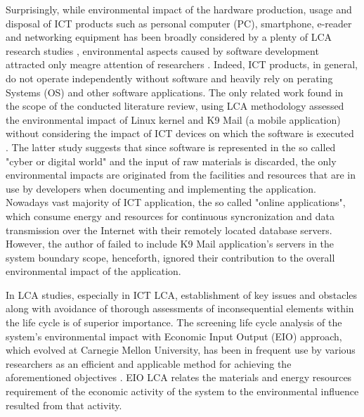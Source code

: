 \documentclass[conference]{IEEEtran}
\begin{document}
Surprisingly, while environmental impact of the hardware production, usage and disposal of ICT products such as personal computer (PC), smartphone, e-reader and networking equipment has been broadly considered by a plenty of LCA research studies \cite{guldbrandsson2012opportunities, Bull201410, farrant2012environmental, enroth2009,koljonen2008environmental}, environmental aspects caused by software development attracted only meagre attention of researchers \cite{Moshnyaga:2013}. Indeed, ICT products, in general, do not operate independently without software and heavily rely on perating Systems (OS) and other software applications. The only related work found in the scope of the conducted literature review, using LCA methodology assessed the environmental impact of Linux kernel and K9 Mail (a mobile application) without considering the impact of ICT devices on which the software is executed \cite{moshnyaga2013assessment,Moshnyaga:2013}. The latter study suggests that since software is represented in the so called "cyber or digital world" and the input of raw materials is discarded, the only environmental impacts are originated from the facilities and resources that are in use by developers when documenting and implementing the application. Nowadays vast majority of ICT application, the so called "online applications", which consume energy and resources for continuous syncronization and data transmission over the Internet with their remotely located database servers. However, the author of \cite{Moshnyaga:2013} failed to include K9 Mail application's servers in the system boundary scope, henceforth, ignored their contribution to the overall environmental impact of the application.

In LCA studies, especially in ICT LCA, establishment of key issues and obstacles along with avoidance of thorough assessments of inconsequential elements within the life cycle is of superior importance. The screening life cycle analysis of the system's environmental impact with Economic Input Output (EIO) approach, which evolved at Carnegie Mellon University, has been in frequent use by various researchers as an efficient and applicable method for achieving the aforementioned objectives \cite{1208069, junnila2008life, matthews2000extending}. EIO LCA relates the materials and energy resources requirement of the economic activity of the system to the environmental influence resulted from that activity.

\end{document}
